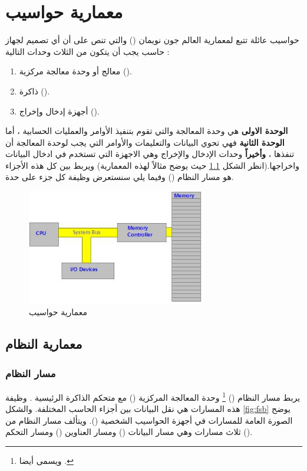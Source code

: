 \documentclass[document.tex]{subfiles}
\begin{document}
\chapter{معمارية حواسيب }
حواسيب عائلة  تتبع لمعمارية العالم جون نويمان () والتي تنص على أن أي تصميم لجهاز حاسب يجب أن يتكون من الثلاث وحدات التالية :
\begin{enumerate}
\item معالج أو وحدة معالجة مركزية ().
\item ذاكرة ().
\item أجهزة إدخال وإخراج ().
\end{enumerate}

\textbf{الوحدة الاولى} هي وحدة المعالجة والتي تقوم بتنفيذ الأوامر والعمليات الحسابية ، أما \textbf{الوحدة الثانية} فهي تحوي البيانات والتعليمات والأوامر التي يجب لوحدة المعالجة أن تنفذها ، \textbf{وأخيراً} وحدات الإدخال والإخراج وهي الاجهزة التي تستخدم في ادخال البيانات واخراجها.(انظر الشكل \ref{fig:vonarch} حيث يوضح مثالاً لهذه المعمارية) ويربط بين كل هذه الأجزاء هو مسار النظام () وفيما يلي سنستعرض وظيفة كل جزء على حدة.

\begin{figure}[h!]
  \label{fig:vonarch} 
  \caption{معمارية حواسيب }
  \centering
   \includegraphics[width=0.7\textwidth]{../img/vonarch}
\end{figure}

\section{معمارية النظام}
\subsection{مسار النظام }
يربط مسار النظام () \footnote{ويسمى أيضا .} وحدة المعالجة المركزية () مع متحكم الذاكرة الرئيسية . وظيفة هذه المسارات هي نقل البيانات بين أجزاء الحاسب المختلفة. والشكل \ref{fig:fsb} يوضح الصورة العامة للمسارات في أجهزة الحواسيب الشخصية (). ويتألف مسار النظام من ثلاث مسارات وهي مسار البيانات () ومسار العناوين () ومسار التحكم ().
\end{document}
